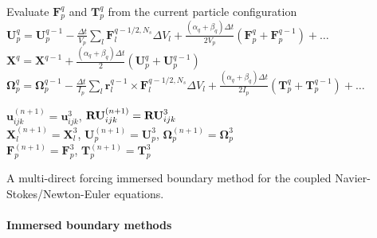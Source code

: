 \begin{algorithm}[h!]
{{   \\
  Evaluate $\bm{F}_{p}^{q}$ and $\bm{T}_{p}^{q}$ from the current particle configuration \\
  ${\bm U}_p^{q} = {\bm U}_p^{q-1} -\frac{\Delta t}{V_p}\sum_l  \bm{F}_{l}^{q-1/2,N_s} \Delta V_l +\frac{(\alpha_q+\beta_q) \Delta t}{2V_p}(\bm{F}_{p}^{q}+\bm{F}_{p}^{q-1})+\dots$ \\
  $\bm{X}^{q}=\bm{X}^{q-1}+\frac{(\alpha_q+\beta_q) \Delta t}{2}(\bm{U}_{p}^{q}+\bm{U}_{p}^{q-1})$ \\
  ${\bm \Omega}_p^{q} = {\bm \Omega}_p^{q-1} -\frac{\Delta t}{I_p}\sum_l \bm{r}_l^{q-1} \times \bm{F}_{l}^{q-1/2,N_s} \Delta V_l +\frac{(\alpha_q+\beta_q) \Delta t}{2I_p}(\bm{T}_{p}^{q}+\bm{T}_{p}^{q-1})+\dots$ \\
  }
  
  ${\bm u}_{ijk}^{(n+1)}={\bm u}_{ijk}^3$, ${\bf RU}_{ijk}^{(n+1)}={\bf RU}_{ijk}^3$  \\
  $\bm{X}_l^{(n+1)}=\bm{X}_l^{3}$, $\bm{U}_p^{(n+1)}=\bm{U}_p^{3}$, $\bm{\Omega}_p^{(n+1)}=\bm{\Omega}_p^{3}$ \\
  $\bm{F}_p^{(n+1)}=\bm{F}_p^{3}$, $\bm{T}_p^{(n+1)}=\bm{T}_p^{3}$ \\
 }
 \caption{A multi-direct forcing immersed boundary method for the coupled Navier-Stokes/Newton-Euler equations.}
 \label{al:ibm}
\end{algorithm}


\medskip
\paragraph{\bf Immersed boundary methods}

